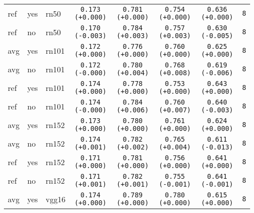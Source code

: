 \begin{tabular}{|l|l|l|c|c|c|c|c|}
\hline
\rowcolor{verylightgray}ref & yes & rn50 & \texttt{0.173 {\color{black}(+0.000)}} & \texttt{0.781 {\color{black}(+0.000)}} & \texttt{0.754 {\color{black}(+0.000)}} & \texttt{0.636 {\color{black}(+0.000)}} & \texttt{8} \\
ref & no & rn50 & \texttt{0.170 {\color{red}(-0.003)}} & \texttt{0.784 {\color{red}(+0.003)}} & \texttt{0.757 {\color{red}(+0.003)}} & \texttt{0.630 {\color{red}(-0.005)}} & \texttt{8} \\
\hline
\rowcolor{verylightgray}avg & yes & rn101 & \texttt{0.172 {\color{black}(+0.000)}} & \texttt{0.776 {\color{black}(+0.000)}} & \texttt{0.760 {\color{black}(+0.000)}} & \texttt{0.625 {\color{black}(+0.000)}} & \texttt{8} \\
avg & no & rn101 & \texttt{0.172 {\color{black}(-0.000)}} & \texttt{0.780 {\color{red}(+0.004)}} & \texttt{0.768 {\color{red}(+0.008)}} & \texttt{0.619 {\color{red}(-0.006)}} & \texttt{8} \\
\hline
\rowcolor{verylightgray}ref & yes & rn101 & \texttt{0.174 {\color{black}(+0.000)}} & \texttt{0.778 {\color{black}(+0.000)}} & \texttt{0.753 {\color{black}(+0.000)}} & \texttt{0.643 {\color{black}(+0.000)}} & \texttt{8} \\
ref & no & rn101 & \texttt{0.174 {\color{black}(-0.000)}} & \texttt{0.784 {\color{red}(+0.006)}} & \texttt{0.760 {\color{red}(+0.007)}} & \texttt{0.640 {\color{red}(-0.003)}} & \texttt{8} \\
\hline
\rowcolor{verylightgray}avg & yes & rn152 & \texttt{0.173 {\color{black}(+0.000)}} & \texttt{0.780 {\color{black}(+0.000)}} & \texttt{0.761 {\color{black}(+0.000)}} & \texttt{0.624 {\color{black}(+0.000)}} & \texttt{8} \\
avg & no & rn152 & \texttt{0.174 {\color{green}(+0.001)}} & \texttt{0.782 {\color{red}(+0.002)}} & \texttt{0.765 {\color{red}(+0.004)}} & \texttt{0.611 {\color{red}(-0.013)}} & \texttt{8} \\
\hline
\rowcolor{verylightgray}ref & yes & rn152 & \texttt{0.171 {\color{black}(+0.000)}} & \texttt{0.781 {\color{black}(+0.000)}} & \texttt{0.756 {\color{black}(+0.000)}} & \texttt{0.641 {\color{black}(+0.000)}} & \texttt{8} \\
ref & no & rn152 & \texttt{0.171 {\color{green}(+0.001)}} & \texttt{0.782 {\color{red}(+0.001)}} & \texttt{0.755 {\color{green}(-0.001)}} & \texttt{0.641 {\color{red}(-0.001)}} & \texttt{8} \\
\hline
\rowcolor{verylightgray}avg & yes & vgg16 & \texttt{0.174 {\color{black}(+0.000)}} & \texttt{0.789 {\color{black}(+0.000)}} & \texttt{0.780 {\color{black}(+0.000)}} & \texttt{0.615 {\color{black}(+0.000)}} & \texttt{8} \\

\end{tabular}
